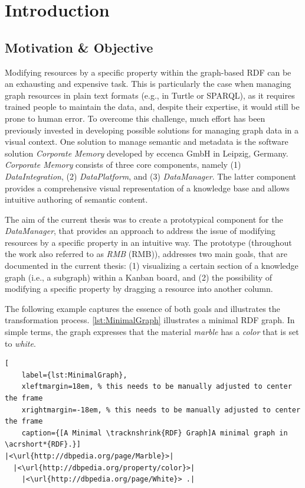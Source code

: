 \chapter{Introduction}
\label{ch:Introduction}

\section{Motivation \& Objective}
\label{sec:Motivation and Objective}


Modifying resources by a specific property within the graph-based \acrfull*{RDF} can be an exhausting and expensive task. This is particularly the case when managing graph resources in plain text formats (e.g., in Turtle or \acrshort*{SPARQL}), as it requires trained people to maintain the data, and, despite their expertise, it would still be prone to human error. To overcome this challenge, much effort has been previously invested in developing possible solutions for managing graph data in a visual context. One solution to manage semantic and metadata is the software solution \textit{Corporate Memory} developed by eccenca GmbH in Leipzig, Germany. \textit{Corporate Memory} consists of three core components, namely (1) \textit{DataIntegration}, (2) \textit{DataPlatform}, and (3) \textit{DataManager}. The latter component provides a comprehensive visual representation of a knowledge base and allows intuitive authoring of semantic content.

The aim of the current thesis was to create a prototypical component for the \textit{DataManager}, that provides an approach to address the issue of modifying resources by a specific property in an intuitive way. The prototype (throughout the work also referred to as \textit{\acrlong*{RMB}} (\acrshort*{RMB})), addresses two main goals, that are documented in the current thesis: (1) visualizing a certain section of a knowledge graph (i.e., a subgraph) within a Kanban board, and (2) the possibility of modifying a specific property by dragging a resource into another column.

The following example captures the essence of both goals and illustrates the transformation process. \autoref{lst:MinimalGraph} illustrates a minimal \acrshort*{RDF} graph. In simple terms, the graph expresses that the material \textit{marble} has a \textit{color} that is set to \textit{white}.

\begin{spacing}{0.9}
    \lstset{language=JavaScript,escapechar=|}
    \begin{lstlisting}[
    label={lst:MinimalGraph},
    xleftmargin=18em, % this needs to be manually adjusted to center the frame
    xrightmargin=-18em, % this needs to be manually adjusted to center the frame
    caption={[A Minimal \tracknshrink{RDF} Graph]A minimal graph in \acrshort*{RDF}.}]
|<\url{http://dbpedia.org/page/Marble}>|
  |<\url{http://dbpedia.org/property/color}>|
    |<\url{http://dbpedia.org/page/White}> .|
\end{lstlisting}
\end{spacing}

